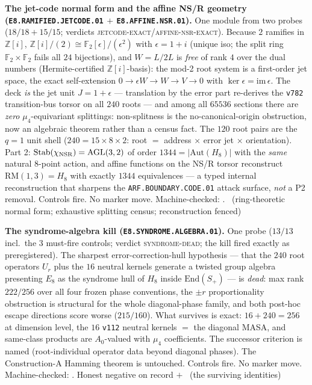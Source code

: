 \documentclass[11pt,a4paper]{article}
\newcommand{\Z}{\mathbb{Z}}
\theoremstyle{definition}
\begin{document}
\par\smallskip\noindent\textbf{The jet-code normal form and the
affine NS/R geometry (\texttt{E8.RAMIFIED.JETCODE.01} $+$
\texttt{E8.AFFINE.NSR.01}).}
One module from two probes ($18/18+15/15$; verdicts
\textsc{jetcode-exact}/\textsc{affine-nsr-exact}).  Because $2$
ramifies in $\Z[i]$, $\Z[i]/(2)\cong\mathbb F_2[\epsilon]/(\epsilon^2)$
with $\epsilon=1{+}i$ (unique iso; the split ring
$\mathbb F_2\times\mathbb F_2$ fails all $24$ bijections), and
$W=L/2L$ is \emph{free} of rank $4$ over the dual numbers
(Hermite-certified $\Z[i]$-basis): the mod-2 root system is a
first-order jet space, the exact self-extension
$0\to\epsilon W\to W\to V\to0$ with
$\ker\epsilon=\mathrm{im}\,\epsilon$.  The deck \emph{is} the jet
unit $J=1{+}\epsilon$ --- translation by the error part re-derives
the \texttt{v782} transition-bus torsor on all $240$ roots --- and
among all $65536$ sections there are \emph{zero} $\mu_4$-equivariant
splittings: non-splitness is the no-canonical-origin obstruction,
now an algebraic theorem rather than a census fact.  The $120$ root
pairs are the $q{=}1$ unit shell ($240=15\times8\times2$: root $=$
address $\times$ error jet $\times$ orientation).  Part 2:
$\mathrm{Stab}(\chi_{\rm NSR})=\mathrm{AGL}(3,2)$ of order
$1344=|\mathrm{Aut}(H_8)|$ with the \emph{same} natural 8-point action, and
affine functions on the NS/R torsor reconstruct
$\mathrm{RM}(1,3)=H_8$ with exactly $1344$ equivalences --- a typed
internal reconstruction that sharpens the
\texttt{ARF.BOUNDARY.CODE.01} attack surface, \emph{not} a P2
removal.  Controls fire.  No marker move.
Machine-checked: .
\mE\ (ring-theoretic normal form; exhaustive splitting census;
reconstruction fenced)
\par\smallskip

\par\smallskip\noindent\textbf{The syndrome-algebra kill
(\texttt{E8.SYNDROME.ALGEBRA.01}).}
One probe ($13/13$ incl.\ the $3$ must-fire controls; verdict
\textsc{syndrome-dead}; the kill fired exactly as preregistered).
The sharpest error-correction-hull hypothesis --- that the $240$
root operators $U_r$ plus the $16$ neutral kernels generate a
twisted group algebra presenting $E_8$ as the syndrome hull of
$H_8$ inside $\mathrm{End}(S_+)$ --- is \emph{dead}: max rank
$222/256$ over all four frozen phase conventions, the $\pm r$
proportionality obstruction is structural for the whole
diagonal-phase family, and both post-hoc escape directions score
worse ($215/160$).  What survives is exact: $16+240=256$ at
dimension level, the $16$ \texttt{v112} neutral kernels $=$ the
diagonal MASA, and same-class products are $A_0$-valued with
$\mu_4$ coefficients.  The successor criterion is named
(root-individual operator data beyond diagonal phases).  The
Construction-A Hamming theorem is untouched.  Controls fire.  No
marker move.
Machine-checked: .
Honest negative on record $+$ \mE\ (the surviving identities)
\par\smallskip
\end{document}
